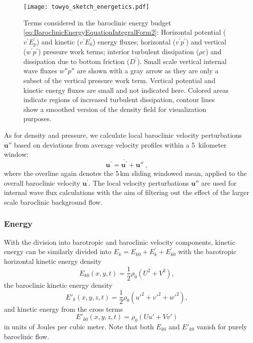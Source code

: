 \documentclass{ametsocV6.1}
\begin{document}
\begin{figure*}
\centerline{\texttt{[image: towyo\_sketch\_energetics.pdf]}}
\caption{Terms considered in the baroclinic energy budget \eqref{eq:BaroclinicEnergyEquationIntegralForm2}: 
Horizontal potential ($v^\prime E_p^\prime$) and kinetic ($v^\prime E_k^\prime$) energy fluxes; horizontal ($v^\prime p^\prime$) and vertical ($w^\prime p^\prime$) pressure work terms; interior turbulent dissipation ($\rho \varepsilon$) and dissipation due to bottom friction ($D^\prime$).
Small scale vertical internal wave fluxes $w''p''$ are shown with a gray arrow as they are only a subset of the vertical pressure work term.
Vertical potential and kinetic energy fluxes are small and not indicated here.
Colored areas indicate regions of increased turbulent dissipation, contour lines show a smoothed version of the density field for visualization purposes.}
\label{fig:EnergyBudgetSketch}
\end{figure*}

As for density and pressure, we calculate local baroclinic velocity perturbations $\mathbf{u''}$ based on deviations from average velocity profiles within a 5~kilometer window:
\begin{equation}
\mathbf{u}^\prime = \overline{\mathbf{u}^\prime} + \mathbf{u}''\ ,
\label{eq:BaroclinicoVelocityDecomposition} 
\end{equation}
where the overline again denotes the 5\,km sliding windowed mean, applied to the overall baroclinic velocity $\mathbf{u}^\prime$.
The local velocity perturbations $\mathbf{u''}$ are used for internal wave flux calculations with the aim of filtering out the effect of the larger scale baroclinic background flow.

\subsubsection{Energy}
With the division into barotropic and baroclinic velocity components, kinetic energy can be similarly divided into $E_k = E_{k0} + E^\prime_k + E^\prime_{k0}$ 
with the barotropic horizontal kinetic energy density
\begin{equation}
E_{k0}(x,y,t) = \frac{1}{2} \rho_0 \left(U^2+V^2\right),
\label{eq:BarotropicKineticEnergy}
\end{equation}
the baroclinic kinetic energy density
\begin{equation}
E'_k(x,y,z,t) = \frac{1}{2} \rho_0 \left({u'}^2 + {v'}^2 + {w'}^2\right),
\label{eq:BaroclinicKineticEnergy}
\end{equation}
and kinetic energy from the cross terms
\begin{equation}
E'_{k0}(x,y,z,t) = \rho_0 (Uu' + Vv')
\label{eq:KineticEnergyCrossTerms}
\end{equation}
in units of Joules per cubic meter.
Note that both $E_{k0}$ and $E'_{k0}$ vanish for purely baroclinic flow.
\end{document}
